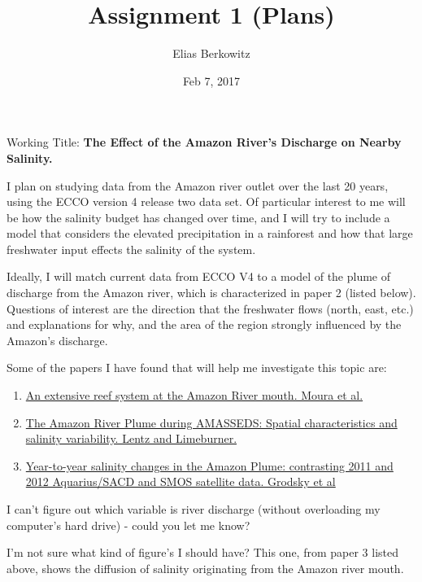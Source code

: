 \documentclass[12pt,a4paper]{article}
\title{Assignment 1 (Plans)}
\date{Feb 7, 2017}
\author{Elias Berkowitz}
\begin{document}
\maketitle

Working Title: \textbf{The Effect of the Amazon River's Discharge on Nearby Salinity.}

I plan on studying data from the Amazon river outlet over the last 20 years, using the ECCO version 4 release two data set. Of particular interest to me will be how the salinity budget has changed over time, and I will try to include a model that considers the elevated precipitation in a rainforest and how that large freshwater input effects the salinity of the system.

Ideally, I will match current data from ECCO V4 to a model of the plume of discharge from the Amazon river, which is characterized in paper 2 (listed below). Questions of interest are the direction that the freshwater flows (north, east, etc.) and explanations for why, and the area of the region strongly influenced by the Amazon's discharge.

Some of the papers I have found that will help me investigate this topic are:

\begin{enumerate}
    \item \href{http://advances.sciencemag.org/content/2/4/e1501252}{An extensive reef system at the Amazon River mouth. Moura et al.}
    \item \href{http://onlinelibrary.wiley.com/doi/10.1029/94JC01411/full}{The Amazon River Plume during AMASSEDS: Spatial characteristics and salinity variability. Lentz and Limeburner.}
    \item \href{http://www.atmos.umd.edu/~senya/HTML/AP/amaz_plume3_r1.pdf}{Year-to-year salinity changes in the Amazon Plume: contrasting 2011 and 2012 Aquarius/SACD and SMOS satellite data. Grodsky et al}
\end{enumerate}

I can't figure out which variable is river discharge (without overloading my computer's hard drive) - could you let me know?

I'm not sure what kind of figure's I should have? This one, from paper 3 listed above, shows the diffusion of salinity originating from the Amazon river mouth.
\end{document}
